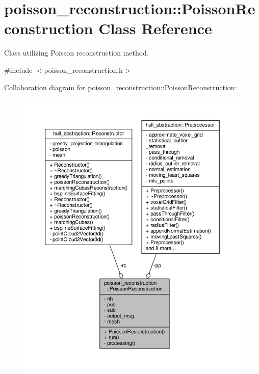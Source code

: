 \hypertarget{classpoisson__reconstruction_1_1_poisson_reconstruction}{}\section{poisson\+\_\+reconstruction\+:\+:Poisson\+Reconstruction Class Reference}
\label{classpoisson__reconstruction_1_1_poisson_reconstruction}


Class utilizing Poisson reconstruction method.  




{\ttfamily \#include $<$poisson\+\_\+reconstruction.\+h$>$}



Collaboration diagram for poisson\+\_\+reconstruction\+:\+:Poisson\+Reconstruction\+:\nopagebreak
\begin{figure}[H]
\begin{center}
\leavevmode
\includegraphics[width=350pt]{classpoisson__reconstruction_1_1_poisson_reconstruction__coll__graph}
\end{center}
\end{figure}
